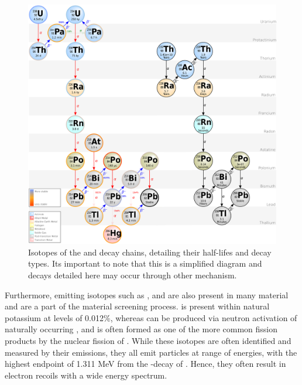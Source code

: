 \begin{figure}[t!]
    \begin{center}
        \includegraphics[scale=0.75]{Chapter_3/Figures/U_Th_Chain.png}
        \caption[Isotopes if the \UTTE{} and \ThTTT{} decay chains, detailing their half-lifes and decay types.]%
        {Isotopes of the \UTTE{} and \ThTTT{} decay chains, detailing their half-lifes and decay types. Its important to note that this is a simplified diagram and decays detailed here may occur through other mechanism.}
        \label{fig:u_238_and_th_232}
    \end{center}
\end{figure}
%


Furthermore, \gray{} emitting isotopes such as \KFZ{},  \CoSZ{} and \CsOTS{} are also present in many material and are a part of the material screening process. \KFZ{} is present within natural potassium at levels of 0.012\%, whereas \CoSZ{} can be produced via neutron activation of naturally occurring \CoFN{}, and \CsOTS{} is often formed as one of the more common fission products by the nuclear fission of \UTTF{}. While these isotopes are often identified and measured by their \gray{} emissions, they all emit \beta particles at range of energies, with the highest endpoint of 1.311 MeV from the \beta-decay of \KFZ{}. Hence, they often result in electron recoils with a wide energy spectrum.

